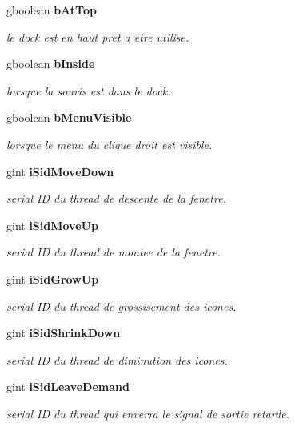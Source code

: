 \begin{CompactItemize}
gboolean {\bf bAtTop}
\begin{CompactList}\small\item\em le dock est en haut pret a etre utilise. \item\end{CompactList}\item 
gboolean {\bf bInside}
\begin{CompactList}\small\item\em lorsque la souris est dans le dock. \item\end{CompactList}\item 
gboolean {\bf bMenuVisible}
\begin{CompactList}\small\item\em lorsque le menu du clique droit est visible. \item\end{CompactList}\item 
gint {\bf iSidMoveDown}
\begin{CompactList}\small\item\em serial ID du thread de descente de la fenetre. \item\end{CompactList}\item 
gint {\bf iSidMoveUp}
\begin{CompactList}\small\item\em serial ID du thread de montee de la fenetre. \item\end{CompactList}\item 
gint {\bf iSidGrowUp}
\begin{CompactList}\small\item\em serial ID du thread de grossisement des icones. \item\end{CompactList}\item 
gint {\bf iSidShrinkDown}
\begin{CompactList}\small\item\em serial ID du thread de diminution des icones. \item\end{CompactList}\item 
gint {\bf iSidLeaveDemand}
\begin{CompactList}\small\item\em serial ID du thread qui enverra le signal de sortie retarde. \item\end{CompactList}\item 

\end{CompactItemize}
